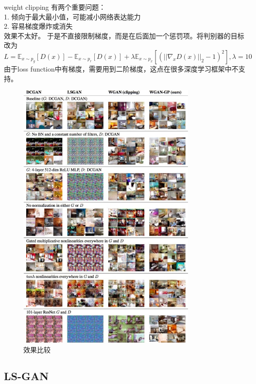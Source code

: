 \documentclass[a4paper]{article}
\begin{document}
weight clipping 有两个重要问题：\\
1. 倾向于最大最小值，可能减小网络表达能力\\
2. 容易梯度爆炸或消失\\
效果不太好。
于是不直接限制梯度，而是在后面加一个惩罚项。将判别器的目标改为
$$L = \mathbb{E}_{x\sim p_g}[D(x)]-\mathbb{E}_{x\sim p_r}[D(x)] + \lambda\mathbb{E}_{x\sim p_x}[(||\nabla_xD(x)||_2-1)^2], \lambda = 10$$
由于loss function中有梯度，需要用到二阶梯度，这点在很多深度学习框架中不支持。
\begin{figure}
\centering
\includegraphics[width=0.8\textwidth]{./img/6.jpg}
\caption{效果比较}
\label{fig:6}
\end{figure}
\subsection{LS-GAN}
\end{document}
